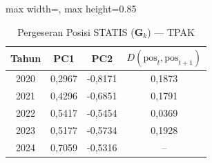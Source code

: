 \begin{table}[H]
\centering
\caption{Pergeseran Posisi STATIS ($\mathbf{G}_k$) --- TPAK} \label{tab:app2jarak_statis_loading_tpak}
\begin{adjustbox}{max width=\textwidth, max height=0.85\textheight}
\begin{tabular}{|c|c|c|c|}
\hline
\textbf{Tahun} & \textbf{PC1} & \textbf{PC2} & \textbf{$D(\text{pos}_t, \text{pos}_{t+1})$} \\
\hline
2020 & 0,2967 & -0,8171 & 0,1873 \\
2021 & 0,4296 & -0,6851 & 0,1791 \\
2022 & 0,5417 & -0,5454 & 0,0369 \\
2023 & 0,5177 & -0,5734 & 0,1928 \\
2024 & 0,7059 & -0,5316 & -- \\
\hline
\end{tabular}
\end{adjustbox}
\end{table}
